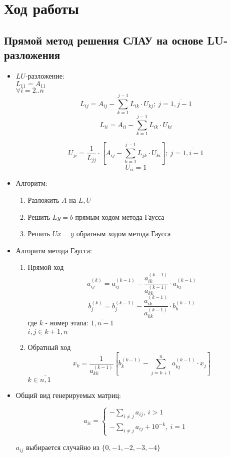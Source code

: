 \section{Ход работы}

\subsection{Прямой метод решения СЛАУ на основе LU-разложения}
\begin{itemize}
	\item $LU$-разложение:\\

	      \(L_{11} = A_{11}\)\\

	      \(\forall i = 2..n\)\\
	      \[L_{ij} = A_{ij} - \sum_{k=1}^{j-1} L_{ik} \cdot U_{kj};\ j = \overline{1, j-1}\]
	      \[L_{ii} = A_{ii} - \sum_{k=1}^{j-1}  L_{ik} \cdot U_{ki}\]

	      \[U_{ji} = \frac{1}{L_{jj}} \cdot \left[A_{ij} - \sum_{k=1}^{j-1} L_{jk} \cdot U_{ki} \right];\ j = \overline{1, i-1}\]
	      \[U_{ii} = 1\]

	\item Алгоритм:
	      \begin{enumerate}
		      \item Разложить $A$ на $L, U$
		      \item Решить $Ly = b$ прямым ходом метода Гаусса
		      \item Решить $Ux = y$ обратным ходом метода Гаусса
	      \end{enumerate}


	\item Алгоритм метода Гаусса:
	      \begin{enumerate}
		      \item Прямой ход
		            \[a_{ij}^{(k)} = a_{ij}^{(k-1)} - \frac{a_{ik}^{(k-1)}}{a_{kk}^{(k-1)}} \cdot a_{kj}^{(k-1)}\]
		            \[b_j^{(k)} = b_j^{(k-1)} - \frac{a_{ik}^{(k-1)}}{a_{kk}^{(k-1)}} \cdot b_k^{(k-1)}\]
		            где $k$ - номер этапа: $\overline{1, n-1}$\\
		            $i,j \in \overline{k + 1, n}$
		      \item Обратный ход
		            \[x_k = \frac{1}{a_{kk}^{(k-1)}} \left[ b_k^{(k-1)} - \sum_{j=k+1}^{n} a_{kj}^{(k-1)} \cdot x_j \right]\]
		            $k \in \overline{n, 1}$
	      \end{enumerate}

	\item Общий вид генерируемых матриц:

	      \[a_{ii} =
		      \begin{cases}
			      -\sum_{i\neq j} a_{ij}, \ i > 1 \\
			      -\sum_{i\neq j} a_{ij} + 10^{-k}, \ i = 1
		      \end{cases}\]

	      \(a_{ij}\) выбирается случайно из \(\{0, -1, -2, -3, -4\}\)
\end{itemize}

